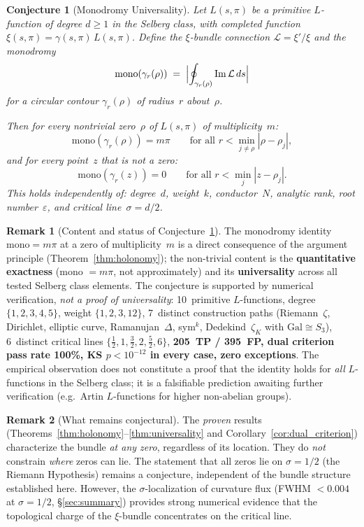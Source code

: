 \documentclass[11pt, a4paper]{article}
\theoremstyle{definition}
\newtheorem{remark}{Remark}[section]
\theoremstyle{plain}
\newtheorem{conjecture}[theorem]{Conjecture}
\newcommand{\xif}{\xi}                      %
\begin{document}
\begin{conjecture}[Monodromy Universality]
\label{conj:mono_universality}
Let $L(s,\pi)$ be a primitive $L$-function of degree $d \geq 1$
in the Selberg class, with completed function
$\xi(s,\pi) = \gamma(s,\pi)\,L(s,\pi)$.
Define the $\xi$-bundle connection
$\mathcal{L} = \xi'/\xi$ and the monodromy
\[
  \mathrm{mono}(\gamma_r(\rho))
  \;=\;
  \Bigl|\oint_{\gamma_r(\rho)} \operatorname{Im}\mathcal{L}\,ds\Bigr|
\]
for a circular contour $\gamma_r(\rho)$ of radius~$r$ about~$\rho$.

Then for every nontrivial zero~$\rho$ of $L(s,\pi)$ of multiplicity~$m$:
\[
  \mathrm{mono}(\gamma_r(\rho)) = m\pi
  \qquad
  \text{for all } r < \min_{j\neq\rho}|\rho - \rho_j|,
\]
and for every point~$z$ that is not a zero:
\[
  \mathrm{mono}(\gamma_r(z)) = 0
  \qquad
  \text{for all } r < \min_j |z - \rho_j|.
\]
This holds independently of: degree~$d$, weight~$k$,
conductor~$N$, analytic rank, root number~$\varepsilon$,
and critical line~$\sigma = d/2$.
\end{conjecture}

\begin{remark}[Content and status of
    Conjecture~\textup{\ref{conj:mono_universality}}]
\label{rem:mono_universality_content}
The monodromy identity $\mathrm{mono} = m\pi$ at a zero of
multiplicity~$m$ is a direct consequence of the argument principle
(Theorem~\ref{thm:holonomy}); the non-trivial content is the
\textbf{quantitative exactness} (mono $= m\pi$, not approximately)
and its \textbf{universality} across all tested Selberg class elements.
The conjecture is supported by numerical verification,
\emph{not a proof of universality}:
10~primitive $L$-functions, degree $\{1,2,3,4,5\}$,
weight $\{1,2,3,12\}$, 7~distinct construction paths
(Riemann~$\zeta$, Dirichlet, elliptic curve, Ramanujan~$\Delta$,
sym$^k$, Dedekind~$\zeta_K$ with $\mathrm{Gal}\cong S_3$),
6~distinct critical lines
$\{\tfrac12,1,\tfrac32,2,\tfrac52,6\}$,
\textbf{205~TP / 395~FP, dual criterion pass rate 100\%,
KS $p < 10^{-12}$ in every case, zero exceptions}.
The empirical observation does not constitute a proof that the
identity holds for \emph{all} $L$-functions in the Selberg class;
it is a falsifiable prediction awaiting further verification
(e.g.\ Artin $L$-functions for higher non-abelian groups).
\end{remark}

\begin{remark}[What remains conjectural]
\label{rem:what_conjectural}
The \emph{proven} results (Theorems~\ref{thm:holonomy}--\ref{thm:universality}
and Corollary~\ref{cor:dual_criterion}) characterize the bundle
\emph{at any zero}, regardless of its location. They do \emph{not}
constrain \emph{where} zeros can lie. The statement that all zeros
lie on $\sigma = 1/2$ (the Riemann Hypothesis) remains a conjecture,
independent of the bundle structure established here. However, the
$\sigma$-localization of curvature flux
(FWHM $< 0.004$ at $\sigma = 1/2$, \S\ref{sec:summary})
provides strong numerical evidence that the topological charge of
the $\xif$-bundle concentrates on the critical line.
\end{remark}
\end{document}

